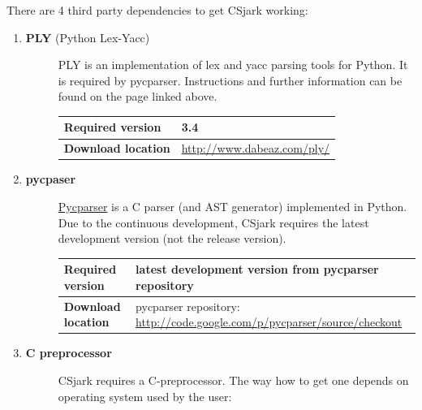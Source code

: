 \documentclass[A4paper,10pt,english]{sphinxmanual}
\begin{document}
There are 4 third party dependencies to get CSjark working:
\begin{enumerate}
\item {} \begin{description}
\item[{\textbf{PLY} (Python Lex-Yacc)}] \leavevmode
PLY is an implementation of lex and yacc parsing tools for Python. It is required by pycparser. Instructions and further information can be found on the page linked above.

\begin{tabulary}{\linewidth}{|L|L|}
\hline

\textbf{Required version}
 & 
3.4
\\\hline

\textbf{Download location}
 & 
\href{http://www.dabeaz.com/ply/}{http://www.dabeaz.com/ply/}
\\\hline
\end{tabulary}


\end{description}

\item {} \begin{description}
\item[{\textbf{pycpaser}}] \leavevmode
\href{http://code.google.com/p/pycparser/}{Pycparser} is a C parser (and AST generator) implemented in Python. Due to the continuous development, CSjark requires the latest development version (not the release version).

\begin{tabulary}{\linewidth}{|L|L|}
\hline

\textbf{Required version}
 & 
latest development version from pycparser repository
\\\hline

\textbf{Download location}
 & 
pycparser repository: \href{http://code.google.com/p/pycparser/source/checkout}{http://code.google.com/p/pycparser/source/checkout}
\\\hline
\end{tabulary}


\end{description}

\item {} \begin{description}
\item[{\textbf{C  preprocessor}}] \leavevmode
CSjark requires a C-preprocessor. The way how to get one depends on operating system used by the user:


\end{description}
\end{enumerate}
\end{document}
